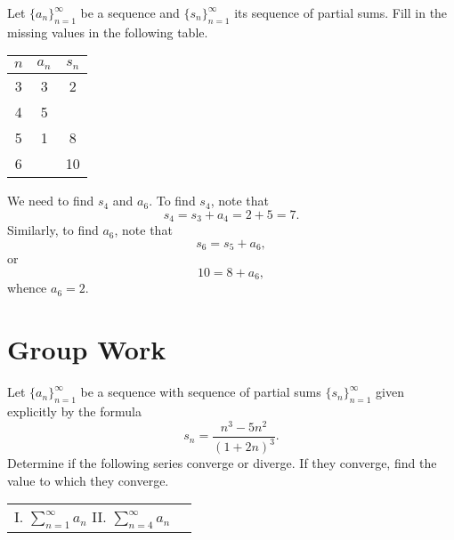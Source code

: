 \documentclass[noauthor, handout]{ximera}
\begin{document}
\begin{problem}
Let $\{a_n\}_{n=1}^\infty$ be a sequence and $\{s_n\}_{n=1}^\infty$ its sequence of partial sums. Fill in the missing values in the following table.

\begin{center}
\begin{tabular}{ |c|c|c| } 
 \hline
$n$ & $a_n$ & $s_n$ \\ 
 \hline
 \hline
  3 & 3 & 2 \\ 
  \hline
    4 & 5 &  \\ 
 \hline
   5 & 1 & 8 \\ 
 \hline
   6 &  & 10 \\ 
 \hline
\end{tabular}
\end{center}

\end{problem}

\begin{freeResponse}
We need to find $s_4$ and $a_6$. To find $s_4$, note that 
$$
s_4 = s_3 + a_4 = 2 + 5 = 7.
$$
Similarly, to find $a_6$, note that
$$
s_6 = s_5 + a_ 6,
$$
or 
$$
10 = 8 + a_6,
$$
whence $a_6 = 2$. 
\end{freeResponse}




\section{Group Work}

\begin{problem}
Let $\{a_n\}_{n=1}^\infty$ be a sequence with sequence of partial sums $\{s_n\}_{n=1}^\infty$ given explicitly by the formula
$$
s_n = \frac{n^3-5n^2}{(1+2n)^3}.
$$
Determine if the following series converge or diverge.  If they converge, find the value to which they converge.
\begin{center}
\begin{tabular}{ll}
I. $\sum_{n=1}^\infty a_n$ \hspace{.6in} II. $\sum_{n=4}^\infty a_n$ \hspace{.6in} 
\end{tabular}
\end{center}
\end{problem}
\end{document}
